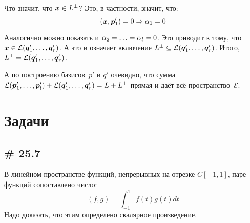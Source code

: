 \documentclass[a4paper,12pt]{article}
\begin{document}
  Что значит, что $\bds x \hm\in L^{\perp}$?
  Это, в частности, значит, что:
  \[
    (\boldsymbol x, \boldsymbol p_1') = 0 \Rightarrow \alpha_1 = 0
  \]
  
  Аналогично можно показать и $\alpha_2 \hm= \ldots \hm= \alpha_l \hm= 0$.
  Это приводит к тому, что $\bds x \hm\in \mathcal L(\bds q_1', \ldots, \bds q_r')$.
  А это и означает включение $L^{\perp} \hm\subseteq \mathcal L(\bds q_1', \ldots, \bds q_r')$.
  Итого, $L^{\perp} \hm= \mathcal L(\bds q_1', \ldots, \bds q_r')$.
  
  А по построению базисов~$p'$ и $q'$ очевидно, что сумма $\mathcal L(\bds p_1', \ldots, \bds p_l') \hm+ \mathcal L(\bds q_1', \ldots, \bds q_r') \hm= L \hm+ L^{\perp}$ прямая и даёт всё пространство~$\mathcal E$.
  
  
  \section{Задачи}
  
  \subsection{\# 25.7}
  
  В линейном пространстве функций, непрерывных на отрезке $C[-1, 1]$, паре функций сопоставлено число:
  \[
    (f, g) = \int_{-1}^{1} f(t) g(t) dt
  \]
  Надо доказать, что этим определено скалярное произведение.
  
\end{document}
